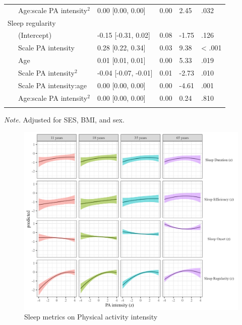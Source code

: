 \documentclass[
  man]{apa6}
\begin{document}
\begin{table}[tbp]
\begin{center}
\begin{threeparttable}
\begin{tabular}{lllll}
\ \ \ Age:scale PA intensity$^2$ & 0.00 [0.00, 0.00] & 0.00 & 2.45 & .032\\
Sleep regularity &  &  &  & \\
\ \ \ (Intercept) & -0.15 [-0.31, 0.02] & 0.08 & -1.75 & .126\\
\ \ \ Scale PA intensity & 0.28 [0.22, 0.34] & 0.03 & 9.38 & < .001\\
\ \ \ Age & 0.01 [0.01, 0.01] & 0.00 & 5.33 & .019\\
\ \ \ Scale PA intensity$^2$ & -0.04 [-0.07, -0.01] & 0.01 & -2.73 & .010\\
\ \ \ Scale PA intensity:age & 0.00 [0.00, 0.00] & 0.00 & -4.61 & .001\\
\ \ \ Age:scale PA intensity$^2$ & 0.00 [0.00, 0.00] & 0.00 & 0.24 & .810\\
\bottomrule
\addlinespace
\end{tabular}

\begin{tablenotes}[para]
\normalsize{\textit{Note.} Adjusted for SES, BMI, and sex. }
\end{tablenotes}

\end{threeparttable}
\end{center}

\end{table}

\begin{figure}
\includegraphics[width=7.08in]{../Figures/sleep on pa_intensity} \caption{Sleep metrics on Physical activity intensity}\label{fig:sleep-by-intensity-fig}
\end{figure}
\end{document}
